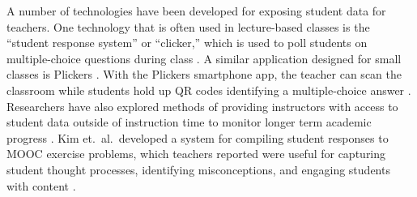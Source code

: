 \documentclass{sigchi}
\begin{document}
A number of technologies have been developed for exposing student data for teachers. One technology that is often used in lecture-based classes is the ``student response system'' or ``clicker,'' which is used to poll students on multiple-choice questions during class \cite{Dangel08, Lazar2007}. A similar application designed for small classes is Plickers \cite{Plickers}. With the Plickers smartphone app, the teacher can scan the classroom while students hold up QR codes identifying a multiple-choice answer \cite{Plickers}. Researchers have also explored methods of providing instructors with access to student data outside of instruction time to monitor longer term academic progress \cite{Zhang2015, Arnold2012}. Kim et.\ al.\ developed a system for compiling student responses to MOOC exercise problems, which teachers reported were useful for capturing student thought processes, identifying misconceptions, and engaging students with content \cite{Kim2015}.



\end{document}
